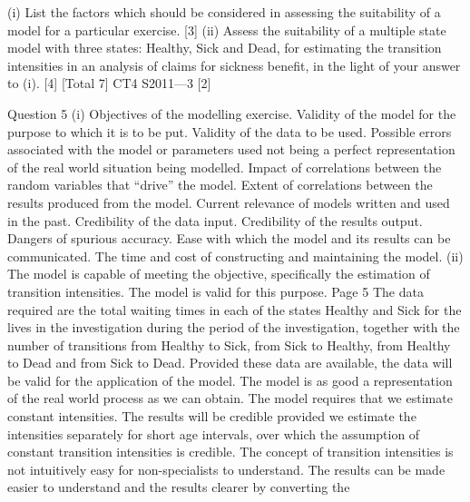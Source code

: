 \documentclass[a4paper,12pt]{article}
\begin{document}
\begin{enumerate}
(i) List the factors which should be considered in assessing the suitability of a
model for a particular exercise.
[3]
(ii) Assess the suitability of a multiple state model with three states: Healthy, Sick
and Dead, for estimating the transition intensities in an analysis of claims for
sickness benefit, in the light of your answer to (i).
[4]
[Total 7]
CT4 S2011—3
[2]













\newpage

Question 5
(i) Objectives of the modelling exercise.
Validity of the model for the purpose to which it is to be put.
Validity of the data to be used.
Possible errors associated with the model or parameters used not being a perfect
representation of the real world situation being modelled.
Impact of correlations between the random variables that “drive” the model.
Extent of correlations between the results produced from the model.
Current relevance of models written and used in the past.
Credibility of the data input.
Credibility of the results output.
Dangers of spurious accuracy.
Ease with which the model and its results can be communicated.
The time and cost of constructing and maintaining the model.
(ii) The model is capable of meeting the objective, specifically the estimation of transition
intensities.
The model is valid for this purpose.
Page 5%
The data required are the total waiting times in each of the states Healthy and Sick for
the lives in the investigation during the period of the investigation, together with the
number of transitions from Healthy to Sick, from Sick to Healthy, from Healthy to Dead and from Sick to Dead.
Provided these data are available, the data will be valid for the application of the
model.
The model is as good a representation of the real world process as we can obtain.
The model requires that we estimate constant intensities. The results will be credible provided we estimate the intensities separately for short age intervals, over which the
assumption of constant transition intensities is credible.
The concept of transition intensities is not intuitively easy for non-specialists to understand.
The results can be made easier to understand and the results clearer by converting the

\end{enumerate}
\end{document}
